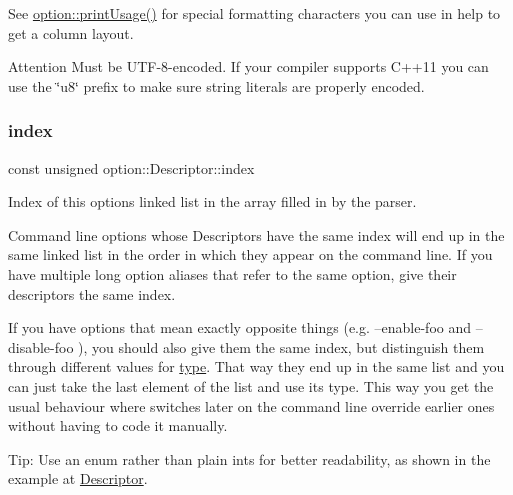 See \hyperlink{namespaceoption_afc8bb7e040a98a0b33ff1ce9da1be0d1}{option\+::print\+Usage()} for special formatting characters you can use in {\ttfamily help} to get a column layout.

\begin{DoxyAttention}{Attention}
Must be U\+T\+F-\/8-\/encoded. If your compiler supports C++11 you can use the \char`\"{}u8\char`\"{} prefix to make sure string literals are properly encoded. 
\end{DoxyAttention}
\mbox{\label{structoption_1_1_descriptor_a1fee8ac44f529c99ac2b1149b4c391b1}} 
\subsubsection{\texorpdfstring{index}{index}}
{\footnotesize\ttfamily const unsigned option\+::\+Descriptor\+::index}



Index of this option\textquotesingle{}s linked list in the array filled in by the parser. 

Command line options whose Descriptors have the same index will end up in the same linked list in the order in which they appear on the command line. If you have multiple long option aliases that refer to the same option, give their descriptors the same {\ttfamily index}.

If you have options that mean exactly opposite things (e.\+g. {\ttfamily --enable-\/foo} and {\ttfamily --disable-\/foo} ), you should also give them the same {\ttfamily index}, but distinguish them through different values for \hyperlink{structoption_1_1_descriptor_a1b220dabd8aad075fa441a80f9b9343c}{type}. That way they end up in the same list and you can just take the last element of the list and use its type. This way you get the usual behaviour where switches later on the command line override earlier ones without having to code it manually.

\begin{DoxyParagraph}{Tip\+:}
Use an enum rather than plain ints for better readability, as shown in the example at \hyperlink{structoption_1_1_descriptor}{Descriptor}. 
\end{DoxyParagraph}
\mbox{\label{structoption_1_1_descriptor_a470c449dfa894c9bfda2dae026142b4b}} 
